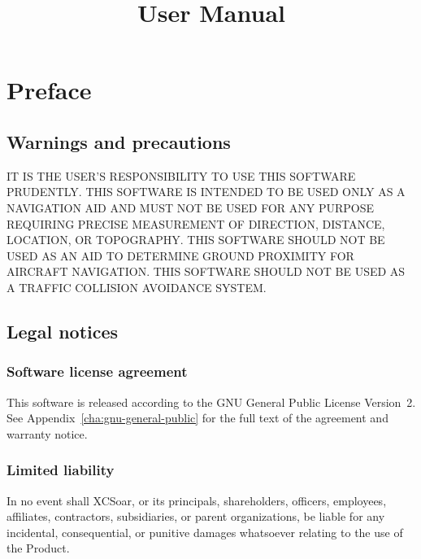 \documentclass[a4paper,12pt]{refrep}
\title{User Manual}
\begin{document}
\maketitle

\listoftodos

 
\begingroup
\setlength{\parskip}{0.1\baselineskip}
\tableofcontents
\endgroup

\chapter*{Preface}

\section*{Warnings and precautions}

\warning IT IS THE USER'S RESPONSIBILITY TO USE THIS SOFT\-WARE PRUDENTLY. THIS SOFTWARE IS 
INTENDED TO BE USED ONLY AS A NAVIGATION AID AND MUST NOT BE USED FOR ANY PURPOSE REQUIRING 
PRECISE MEASURE\-MENT OF DIRECTION, DISTANCE, LOCATION, OR TOPO\-GRAPHY. THIS SOFTWARE SHOULD 
NOT BE USED AS AN AID TO DETERMINE GROUND PROXIMITY FOR AIRCRAFT NAVIGATION. THIS SOFTWARE 
SHOULD NOT BE USED AS A TRAFFIC COLLISION AVOIDANCE SYSTEM.


\section*{Legal notices}

\subsection*{Software license agreement}

This software is released according to the GNU General Public License
Version~2.  See Appendix~\ref{cha:gnu-general-public} for the full
text of the agreement and warranty notice.

\subsection*{Limited liability}

In no event shall XCSoar, or its principals, shareholders, officers,
employees, affiliates, contractors, subsidiaries, or parent
organizations, be liable for any incidental, consequential, or
punitive damages whatsoever relating to the use of the Product.
\end{document}
